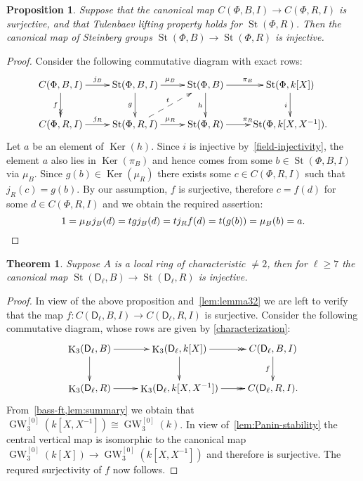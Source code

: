 \documentclass[oneside, 10pt]{amsart}
\newtheorem{prop}{Proposition}
\newtheorem{theorem}{Theorem}
\theoremstyle{remark}
\theoremstyle{definition}
\DeclareMathOperator{\Ker}{Ker}
\DeclareMathOperator{\St}{St}
\DeclareMathOperator{\K}{K}
\DeclareMathOperator{\GW}{GW}
\newcommand{\rD}{\mathsf{D}}
\numberwithin{equation}{section}
\begin{document}
\begin{prop}
 Suppose that the canonical map $C(\Phi, B, I) \to C(\Phi, R, I)$ is surjective,
  and that Tulenbaev lifting property holds for $\St(\Phi, R)$. 
 Then the canonical map of Steinberg groups $\St(\Phi, B) \to \St(\Phi, R)$ is injective.
\end{prop}
\begin{proof}
 Consider the following commutative diagram with exact rows: 
\begin{equation*} \xymatrix{
 C(\Phi, B, I) \ar[r]^{j_B} \ar@{->>}[d]_{f} & \St(\Phi, B, I) \ar[r]^{\mu_B} \ar[d]_{g} &
 \St(\Phi, B) \ar[r]^{\pi_B} \ar[d]_{h} & \St(\Phi, k[X]) \ar[d]_{i} \\
 C(\Phi, R, I) \ar[r]^{j_R}         & \St(\Phi, R, I) \ar[r]^{\mu_R} \ar@{-->}[ur]^{t}&
 \St(\Phi, R) \ar[r]^{\pi_R}        & \St(\Phi, k[X, X^{-1}]).
}\end{equation*}
Let $a$ be an element of $\Ker(h)$. Since $i$ is injective by~\cref{field-injectivity}, the element $a$ also lies in $\Ker(\pi_B)$ and hence comes from some $b \in \St(\Phi, B, I)$ via $\mu_B$. Since $g(b) \in \Ker(\mu_R)$ there exists some $c \in C(\Phi, R, I)$ such that $j_R(c) = g(b)$. By our assumption, $f$ is surjective, therefore
 $c = f(d)$ for some $d \in C(\Phi, R, I)$ and we obtain the required assertion:
 \[ 1 = \mu_Bj_B(d) = tgj_B(d) = tj_Rf(d) =t(g(b)) = \mu_B(b) = a. \qedhere \]

\end{proof}

\begin{theorem} Suppose $A$ is a local ring of characteristic $\neq 2$, then for $\ell \geq 7$
  the canonical map $\St(\rD_\ell, B) \to \St(\rD_\ell, R)$ is injective.
\end{theorem}
\begin{proof}
 In view of the above proposition and~\cref{lem:lemma32} we are left to verify that the map $f\colon C(\rD_\ell, B, I) \to C(\rD_\ell, R, I)$ is surjective. Consider the following commutative diagram, whose rows are given by \cref{characterization}:
 \begin{equation*}\xymatrix{
  \K_3(\rD_\ell, B) \ar[r] \ar[d] & \K_3(\rD_\ell, k[X]) \ar[d] \ar@{->>}[r] & \ar[d]_{f} C(\rD_\ell, B, I) \\
  \K_3(\rD_\ell, R) \ar[r]        & \K_3(\rD_\ell, k[X, X^{-1}]) \ar@{->>}[r]        & C(\rD_\ell, R, I).}\end{equation*}
 From~\cref{bass-ft,lem:summary} we obtain that $\GW_3^{[0]}(k[X, X^{-1}]) \cong \GW_3^{[0]}(k)$.
 In view of~\cref{lem:Panin-stability} the central vertical map is isomorphic to the canonical map
 $\GW_3^{[0]}(k[X]) \to \GW_3^{[0]}(k[X, X^{-1}])$ and therefore is surjective. The requred surjectivity of $f$ now follows.
\end{proof}
\end{document}
